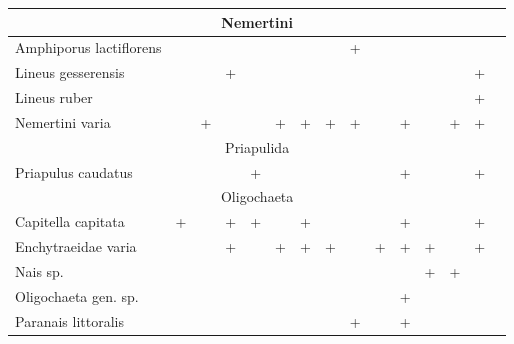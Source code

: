 \begin{footnotesize}
\begin{longtable}{|p{2cm}|p{0.4cm}p{0.4cm}|p{0.4cm}p{0.4cm}|p{0.4cm}p{0.4cm}|p{0.35cm}p{0.35cm}p{0.35cm}|p{1cm}|p{0.5cm}p{0.5cm}|p{1cm}|p{1cm}|}
\multicolumn{15}{|c|}{Nemertini} \\ \hline
Amphiporus lactiflorens   &           &           &           &           &           &           &          & +        &          &                 &          &          &          &            \\  \hline
Lineus gesserensis        &           &           & +         &           &           &           &          &          &          &                 &          &          & +        &            \\  \hline
Lineus ruber              &           &           &           &           &           &           &          &          &          &                 &          &          & +        &            \\  \hline
Nemertini varia           &           & +         &           &           & +         & +         & +        & +        &          & +               &          & +        & +        &            \\ \hline
\multicolumn{15}{|c|}{Priapulida} \\ \hline
Priapulus caudatus        &           &           &           & +         &           &           &          &          &          & +               &          &          & +        &            \\ \hline
\multicolumn{15}{|c|}{Oligochaeta} \\ \hline
Capitella capitata        & +         &           & +         & +         &           & +         &          &          &          & +               &          &          & +        &            \\  \hline
Enchytraeidae varia       &           &           & +         &           & +         & +         & +        &          & +        & +               & +        &          & +        &            \\  \hline
Nais sp.                  &           &           &           &           &           &           &          &          &          &                 & +        & +        &          &            \\  \hline
Oligochaeta gen. sp.      &           &           &           &           &           &           &          &          &          & +               &          &          &          &            \\  \hline
Paranais littoralis       &           &           &           &           &           &           &          & +        &          & +               &          &          &          &            \\  \hline

\end{longtable}
\end{footnotesize}
